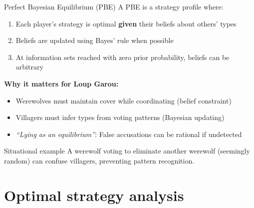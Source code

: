 \documentclass[10pt]{beamer}
\begin{document}
\begin{frame}{Perfect Bayesian Equilibrium (PBE)}
  A PBE is a strategy profile where:
  \begin{enumerate}
    \item Each player's strategy is optimal \textbf{given} their beliefs about others' types
    \item Beliefs are updated using Bayes' rule when possible
    \item At information sets reached with zero prior probability, beliefs can be arbitrary
  \end{enumerate}

  \vspace{0.5cm}
  \textbf{Why it matters for Loup Garou:}
  \begin{itemize}
    \item Werewolves must maintain cover while coordinating (belief constraint)
    \item Villagers must infer types from voting patterns (Bayesian updating)
    \item \textit{``Lying as an equilibrium''}: False accusations can be rational if undetected
  \end{itemize}

  \begin{exampleblock}{Situational example}
    A werewolf voting to eliminate another werewolf (seemingly random) can confuse villagers, preventing pattern recognition.
  \end{exampleblock}
\end{frame}

\section{Optimal strategy analysis}
\end{document}
